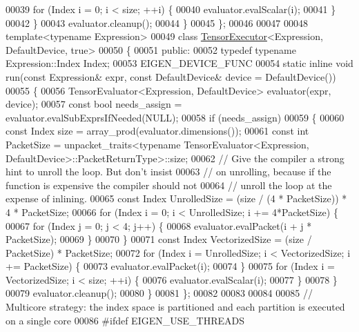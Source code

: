\begin{DoxyCode}
00039       \textcolor{keywordflow}{for} (Index i = 0; i < size; ++i) \{
00040         evaluator.evalScalar(i);
00041       \}
00042     \}
00043     evaluator.cleanup();
00044   \}
00045 \};
00046 
00047 
00048 \textcolor{keyword}{template}<\textcolor{keyword}{typename} Expression>
00049 \textcolor{keyword}{class }\hyperlink{class_tensor_executor}{TensorExecutor}<Expression, DefaultDevice, true>
00050 \{
00051  \textcolor{keyword}{public}:
00052   \textcolor{keyword}{typedef} \textcolor{keyword}{typename} Expression::Index Index;
00053   EIGEN\_DEVICE\_FUNC
00054   \textcolor{keyword}{static} \textcolor{keyword}{inline} \textcolor{keywordtype}{void} run(\textcolor{keyword}{const} Expression& expr, \textcolor{keyword}{const} DefaultDevice& device = DefaultDevice())
00055   \{
00056     TensorEvaluator<Expression, DefaultDevice> evaluator(expr, device);
00057     \textcolor{keyword}{const} \textcolor{keywordtype}{bool} needs\_assign = evaluator.evalSubExprsIfNeeded(NULL);
00058     \textcolor{keywordflow}{if} (needs\_assign)
00059     \{
00060       \textcolor{keyword}{const} Index size = array\_prod(evaluator.dimensions());
00061       \textcolor{keyword}{const} \textcolor{keywordtype}{int} PacketSize = unpacket\_traits<typename TensorEvaluator<Expression,
       DefaultDevice>::PacketReturnType>::size;
00062       \textcolor{comment}{// Give the compiler a strong hint to unroll the loop. But don't insist}
00063       \textcolor{comment}{// on unrolling, because if the function is expensive the compiler should not}
00064       \textcolor{comment}{// unroll the loop at the expense of inlining.}
00065       \textcolor{keyword}{const} Index UnrolledSize = (size / (4 * PacketSize)) * 4 * PacketSize;
00066       \textcolor{keywordflow}{for} (Index i = 0; i < UnrolledSize; i += 4*PacketSize) \{
00067         \textcolor{keywordflow}{for} (Index j = 0; j < 4; j++) \{
00068           evaluator.evalPacket(i + j * PacketSize);
00069         \}
00070       \}
00071       \textcolor{keyword}{const} Index VectorizedSize = (size / PacketSize) * PacketSize;
00072       \textcolor{keywordflow}{for} (Index i = UnrolledSize; i < VectorizedSize; i += PacketSize) \{
00073         evaluator.evalPacket(i);
00074       \}
00075       \textcolor{keywordflow}{for} (Index i = VectorizedSize; i < size; ++i) \{
00076         evaluator.evalScalar(i);
00077       \}
00078     \}
00079     evaluator.cleanup();
00080   \}
00081 \};
00082 
00083 
00084 
00085 \textcolor{comment}{// Multicore strategy: the index space is partitioned and each partition is executed on a single core}
00086 \textcolor{preprocessor}{#ifdef EIGEN\_USE\_THREADS}

\end{DoxyCode}
